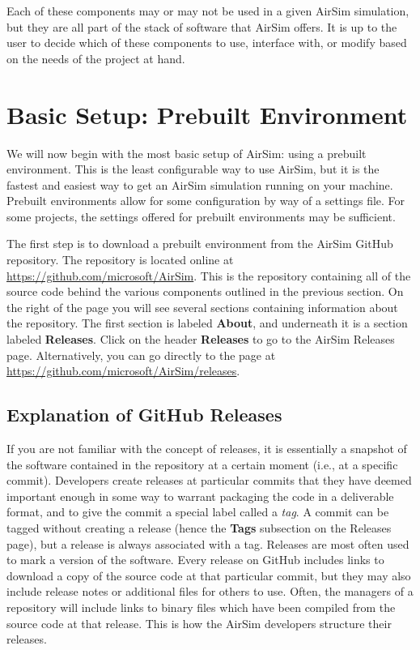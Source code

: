 Each of these components may or may not be used in a given AirSim simulation, but they are all part of the stack of software that AirSim offers. It is up to the user to decide which of these components to use, interface with, or modify based on the needs of the project at hand.

\section{Basic Setup: Prebuilt Environment}\label{sec:basic_setup}

We will now begin with the most basic setup of AirSim: using a prebuilt environment. This is the least configurable way to use AirSim, but it is the fastest and easiest way to get an AirSim simulation running on your machine. Prebuilt environments allow for some configuration by way of a settings file. For some projects, the settings offered for prebuilt environments may be sufficient.

The first step is to download a prebuilt environment from the AirSim GitHub repository. The repository is located online at \url{https://github.com/microsoft/AirSim}. This is the repository containing all of the source code behind the various components outlined in the previous section. On the right of the page you will see several sections containing information about the repository. The first section is labeled \textbf{About}, and underneath it is a section labeled \textbf{Releases}. Click on the header \textbf{Releases} to go to the AirSim Releases page. Alternatively, you can go directly to the page at \url{https://github.com/microsoft/AirSim/releases}.

\subsection{Explanation of GitHub Releases}
If you are not familiar with the concept of releases, it is essentially a snapshot of the software contained in the repository at a certain moment (i.e., at a specific commit). Developers create releases at particular commits that they have deemed important enough in some way to warrant packaging the code in a deliverable format, and to give the commit a special label called a \textit{tag}. A commit can be tagged without creating a release (hence the \textbf{Tags} subsection on the Releases page), but a release is always associated with a tag. Releases are most often used to mark a version of the software. Every release on GitHub includes links to download a copy of the source code at that particular commit, but they may also include release notes or additional files for others to use. Often, the managers of a repository will include links to binary files which have been compiled from the source code at that release. This is how the AirSim developers structure their releases.

